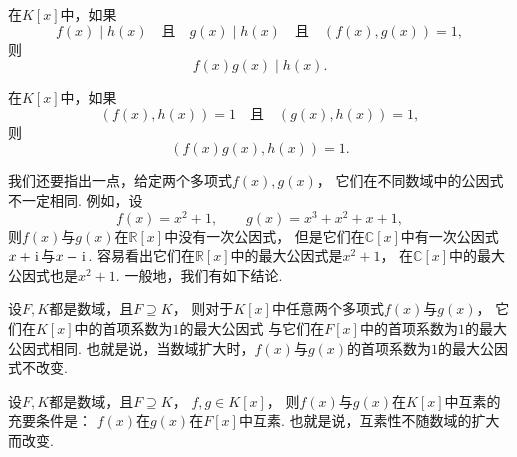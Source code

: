 \begin{property}
在\(K[x]\)中，如果\[
	f(x) \mid h(x)
	\quad\text{且}\quad
	g(x) \mid h(x)
	\quad\text{且}\quad
	(f(x),g(x))=1,
\]
则\[
	f(x) g(x) \mid h(x).
\]
\end{property}

\begin{property}
在\(K[x]\)中，如果\[
	(f(x),h(x))=1
	\quad\text{且}\quad
	(g(x),h(x))=1,
\]
则\[
	(f(x) g(x),h(x))=1.
\]
\end{property}

我们还要指出一点，给定两个多项式\(f(x),g(x)\)，
它们在不同数域中的公因式不一定相同.
例如，设\[
	f(x) = x^2+1, \qquad
	g(x) = x^3+x^2+x+1,
\]
则\(f(x)\)与\(g(x)\)在\(\mathbb{R}[x]\)中没有一次公因式，
但是它们在\(\mathbb{C}[x]\)中有一次公因式\(x+\kern1pt\mathrm{i}\kern1pt\)与\(x-\kern1pt\mathrm{i}\kern1pt\).
容易看出它们在\(\mathbb{R}[x]\)中的最大公因式是\(x^2+1\)，
在\(\mathbb{C}[x]\)中的最大公因式也是\(x^2+1\).
一般地，我们有如下结论.

\begin{proposition}
设\(F,K\)都是数域，且\(F \supseteq K\)，
则对于\(K[x]\)中任意两个多项式\(f(x)\)与\(g(x)\)，
它们在\(K[x]\)中的首项系数为\(1\)的最大公因式
与它们在\(F[x]\)中的首项系数为\(1\)的最大公因式相同.
也就是说，当数域扩大时，\(f(x)\)与\(g(x)\)的首项系数为\(1\)的最大公因式不改变.
\end{proposition}

\begin{corollary}
设\(F,K\)都是数域，且\(F \supseteq K\)，
\(f,g \in K[x]\)，
则\(f(x)\)与\(g(x)\)在\(K[x]\)中互素的充要条件是：
\(f(x)\)在\(g(x)\)在\(F[x]\)中互素.
也就是说，互素性不随数域的扩大而改变.
\end{corollary}
